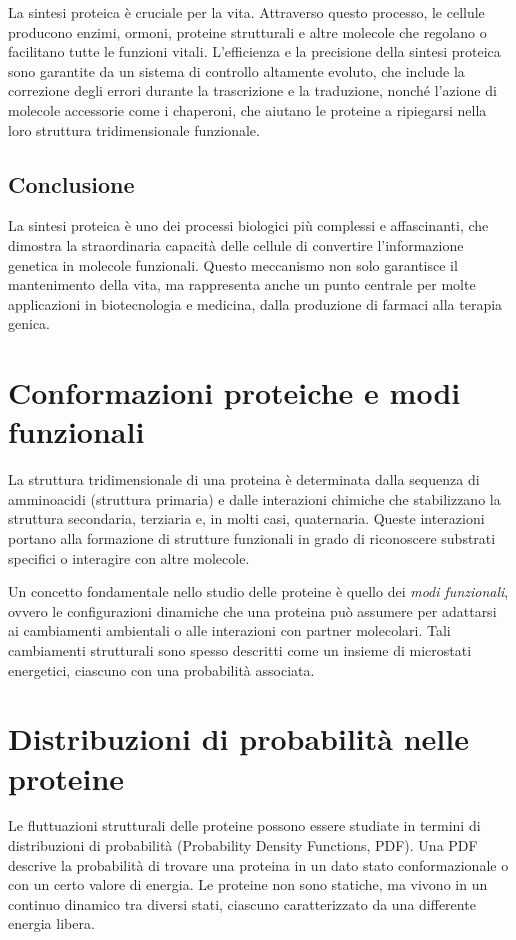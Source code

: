 \documentclass[Lau,binding=0.6cm,oneside,noexaminfo]{sapthesis}
\begin{document}
La sintesi proteica è cruciale per la vita. Attraverso questo processo, le cellule producono enzimi, ormoni, proteine strutturali e altre molecole che regolano o facilitano tutte le funzioni vitali. L'efficienza e la precisione della sintesi proteica sono garantite da un sistema di controllo altamente evoluto, che include la correzione degli errori durante la trascrizione e la traduzione, nonché l'azione di molecole accessorie come i chaperoni, che aiutano le proteine a ripiegarsi nella loro struttura tridimensionale funzionale.

\subsection{Conclusione}

La sintesi proteica è uno dei processi biologici più complessi e affascinanti, che dimostra la straordinaria capacità delle cellule di convertire l'informazione genetica in molecole funzionali. Questo meccanismo non solo garantisce il mantenimento della vita, ma rappresenta anche un punto centrale per molte applicazioni in biotecnologia e medicina, dalla produzione di farmaci alla terapia genica.

\section*{Conformazioni proteiche e modi funzionali}
La struttura tridimensionale di una proteina è determinata dalla sequenza di amminoacidi (struttura primaria) e dalle interazioni chimiche che stabilizzano la struttura secondaria, terziaria e, in molti casi, quaternaria. Queste interazioni portano alla formazione di strutture funzionali in grado di riconoscere substrati specifici o interagire con altre molecole.

Un concetto fondamentale nello studio delle proteine è quello dei \emph{modi funzionali}, ovvero le configurazioni dinamiche che una proteina può assumere per adattarsi ai cambiamenti ambientali o alle interazioni con partner molecolari. Tali cambiamenti strutturali sono spesso descritti come un insieme di microstati energetici, ciascuno con una probabilità associata.

\section*{Distribuzioni di probabilità nelle proteine}
Le fluttuazioni strutturali delle proteine possono essere studiate in termini di distribuzioni di probabilità (Probability Density Functions, PDF). Una PDF descrive la probabilità di trovare una proteina in un dato stato conformazionale o con un certo valore di energia. Le proteine non sono statiche, ma vivono in un continuo dinamico tra diversi stati, ciascuno caratterizzato da una differente energia libera. 
\end{document}

